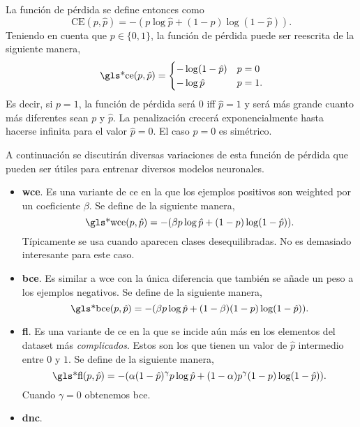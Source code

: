 La función de pérdida se define entonces como
\begin{equation}
  \text{CE}(p, \hat{p}) = -(p\log\hat{p} + (1 - p)\log(1 - \hat{p})).
\end{equation}
Teniendo en cuenta que \(p \in \{0, 1\}\), la función de pérdida puede ser
reescrita de la siguiente manera,
\begin{equation}
  \text{\gls*{ce}}(p, \hat{p}) =
  \begin{cases}
    -\log(1 - \hat{p}) & p = 0 \\
    -\log\hat{p} & p = 1.
  \end{cases}
\end{equation}
Es decir, si \(p = 1\), la función de pérdida será \(0\) \gls{iff} \(\hat{p} =
1\) y será más grande cuanto más diferentes sean \(p\) y \(\hat{p}\). La
penalización crecerá exponencialmente hasta hacerse infinita para el valor
\(\hat{p} = 0\). El caso \(p = 0\) es simétrico.

A continuación se discutirán diversas variaciones de esta función de pérdida
que pueden ser útiles para entrenar diversos modelos neuronales.

\begin{itemize}
  \item \textbf{\gls*{wce}}. Es una variante de \gls{ce} en la que los ejemplos
  positivos son weighted por un coeficiente \(\beta\). Se define de la
  siguiente manera,
  \begin{equation}
    \text{\gls*{wce}}(p, \hat{p}) =
    -(\beta p\log\hat{p} + (1 - p)\log(1 - \hat{p})).
  \end{equation}
  Típicamente se usa cuando aparecen clases desequilibradas. No es demasiado
  interesante para este caso.
  \item \textbf{\gls*{bce}}. Es similar a \gls{wce} con la única diferencia que
  también se añade un peso a los ejemplos negativos. Se define de la siguiente
  manera,
  \begin{equation}
    \text{\gls*{bce}}(p, \hat{p}) =
    -(\beta p\log\hat{p} + (1 - \beta)(1 - p)\log(1 - \hat{p})).
  \end{equation}
  \item \textbf{\gls*{fl}}. Es una variante de \gls{ce} en la que se incide aún
  más en los elementos del dataset más \emph{complicados}. Estos son los que
  tienen un valor de \(\hat{p}\) intermedio entre \(0\) y \(1\). Se define de
  la siguiente manera,
  \begin{equation}
    \text{\gls*{fl}}(p, \hat{p}) =
    -(\alpha (1 - \hat{p})^\gamma p\log\hat{p} +
    (1 - \alpha)p^\gamma (1 - p)\log(1 - \hat{p})).
  \end{equation}
  Cuando \(\gamma = 0\) obtenemos \gls{bce}.
  \item \textbf{\gls*{dnc}}.
\end{itemize}

